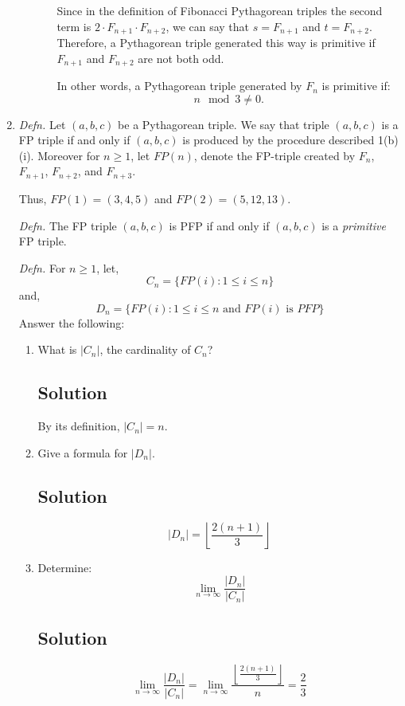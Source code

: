 \documentclass[12pt]{amsart}
\begin{document}
\begin{enumerate}
\begin{enumerate}
\begin{enumerate}
Since in the definition of Fibonacci Pythagorean triples the second term is $2\cdot F_{n+1}\cdot F_{n+2}$, we can say that $s = F_{n+1}$ and $t=F_{n+2}$. Therefore, a Pythagorean triple generated this way is primitive if $F_{n+1}$ and $F_{n+2}$ are not both odd.

In other words, a Pythagorean triple generated by $F_n$ is primitive if:
\[ n\mod 3 \not= 0. \]

\end{enumerate}

\end{enumerate}

\item {\it Defn.} Let $(a,b,c)$ be a Pythagorean triple. We say that triple $(a,b,c)$ is a FP triple if and only if $(a,b,c)$ is produced by the procedure described 1(b)(i). Moreover for $n\ge 1$, let $FP(n)$, denote the FP-triple created by $F_n$, $F_{n+1}$, $F_{n+2}$, and $F_{n+3}$.

Thus, $FP(1) = (3,4,5)$ and $FP(2) = (5,12,13)$.

{\it Defn.} The FP triple $(a,b,c)$ is PFP if and only if $(a,b,c)$ is a {\it primitive} FP triple.

{\it Defn.} For $n \ge 1$, let,
%
\[ C_n = \{ FP(i) : 1 \le i \le n \} \]
%
and,
%
\[ D_n = \{ FP(i) : 1 \le i \le n \textrm{  and } FP(i) \textrm{ is } PFP \} \]
%
Answer the following:
\begin{enumerate}\setlength{\itemsep}{6pt}
\item What is $|C_n|$, the cardinality of $C_n$?

\subsection*{Solution}
By its definition, $|C_n| = n$.

\item Give a formula for $|D_n|$.

\subsection*{Solution}
\[ |D_n| = \left\lfloor \frac{2(n+1)}{3} \right\rfloor \]
\item Determine:
%
\[ \lim_{n\to\infty} \frac{|D_n|}{|C_n|} \]
%

\subsection*{Solution}
%
\[ \lim_{n\to\infty} \frac{|D_n|}{|C_n|} =  \lim_{n\to\infty} \frac {\left\lfloor \frac{2(n+1)}{3} \right\rfloor}{n} = \frac 2 3 \]
%


\end{enumerate}
\end{enumerate}
\end{document}
